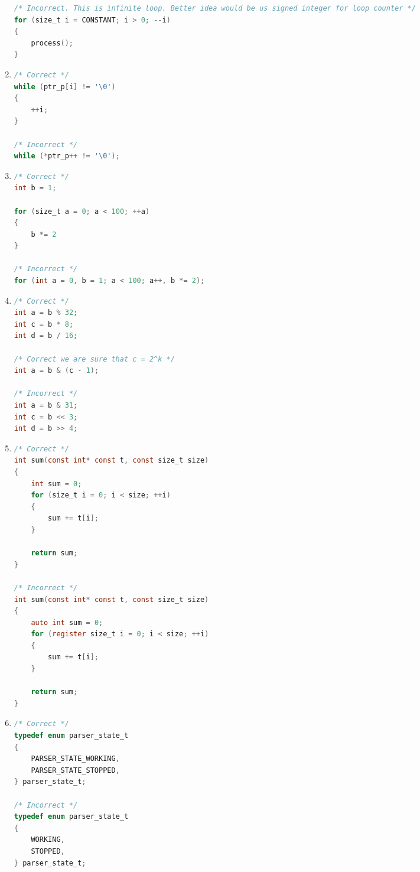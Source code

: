 \begin{enumerate}
\begin{lstlisting}[language=C,style=C99]
/* Incorrect. This is infinite loop. Better idea would be us signed integer for loop counter */
for (size_t i = CONSTANT; i > 0; --i)
{
    process();
}
\end{lstlisting}

    \item 
\begin{lstlisting}[language=C,style=C99]
/* Correct */
while (ptr_p[i] != '\0') 
{
    ++i;
}

/* Incorrect */
while (*ptr_p++ != '\0');
\end{lstlisting}   

    \item 
\begin{lstlisting}[language=C,style=C99]
/* Correct */
int b = 1; 

for (size_t a = 0; a < 100; ++a) 
{ 
    b *= 2
}

/* Incorrect */
for (int a = 0, b = 1; a < 100; a++, b *= 2);
\end{lstlisting} 
    
    
    \item
\begin{lstlisting}[language=C,style=C99]
/* Correct */
int a = b % 32;
int c = b * 8;
int d = b / 16;

/* Correct we are sure that c = 2^k */
int a = b & (c - 1);

/* Incorrect */
int a = b & 31;
int c = b << 3;
int d = b >> 4;
\end{lstlisting} 


    \item
\begin{lstlisting}[language=C,style=C99]
/* Correct */
int sum(const int* const t, const size_t size)
{
    int sum = 0;
    for (size_t i = 0; i < size; ++i)
    {
        sum += t[i];
    }
    
    return sum;
}

/* Incorrect */
int sum(const int* const t, const size_t size)
{
    auto int sum = 0;
    for (register size_t i = 0; i < size; ++i)
    {
        sum += t[i];
    }
    
    return sum;
}
\end{lstlisting} 


    \item 
\begin{lstlisting}[language=C,style=C99]
/* Correct */
typedef enum parser_state_t
{
    PARSER_STATE_WORKING,
    PARSER_STATE_STOPPED,
} parser_state_t;

/* Incorrect */
typedef enum parser_state_t
{
    WORKING,
    STOPPED,
} parser_state_t;
\end{lstlisting} 
    

\end{enumerate}
